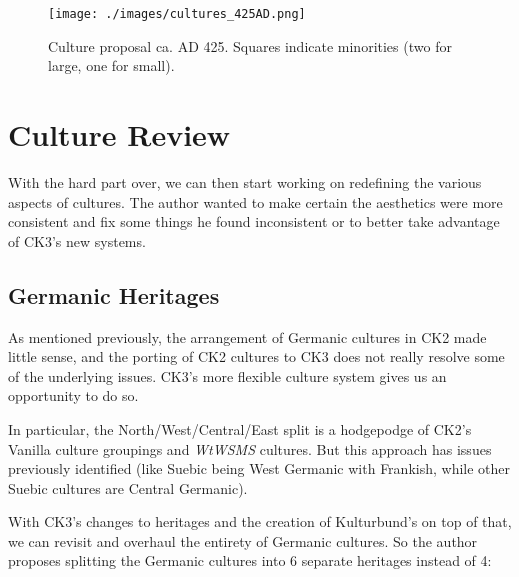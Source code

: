 \documentclass{article}
\begin{document}
	\begin{figure}[h!]
		\centering
		\texttt{[image: ./images/cultures\_425AD.png]}
		\caption{Culture proposal ca. AD 425. Squares indicate minorities (two for large, one for small).}
	\end{figure}
	
	\newpage
	
	\section{Culture Review}
	\label{sec:culture_review}
	
	With the hard part over, we can then start working on redefining the various aspects of cultures.
	The author wanted to make certain the aesthetics were more consistent and fix some things he found inconsistent or to better take advantage of CK3's new systems.
	
	\subsection{Germanic Heritages}
	\label{sec:culture_review:subsec:germanic_heritages}
	As mentioned previously, the arrangement of Germanic cultures in CK2 made little sense, and the porting of CK2 cultures to CK3 does not really resolve some of the underlying issues.
	CK3's more flexible culture system gives us an opportunity to do so.
	
	In particular, the North/West/Central/East split is a hodgepodge of CK2's Vanilla culture groupings and \textit{WtWSMS} cultures.
	But this approach has issues previously identified (like Suebic being West Germanic with Frankish, while other Suebic cultures are Central Germanic).
	
	With CK3's changes to heritages and the creation of Kulturbund's on top of that, we can revisit and overhaul the entirety of Germanic cultures.
	So the author proposes splitting the Germanic cultures into 6 separate heritages instead of 4:
	
\end{document}
